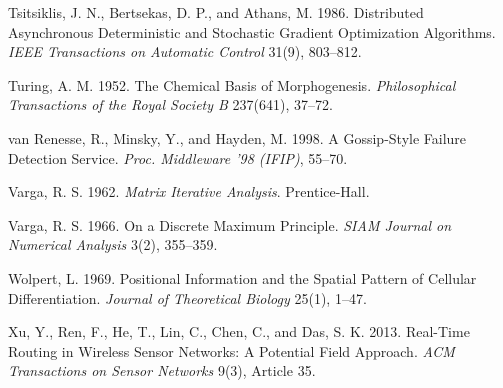 \documentclass[11pt]{article}
\theoremstyle{plain}
\numberwithin{equation}{section}
\begin{document}
Tsitsiklis, J. N., Bertsekas, D. P., and Athans, M. 1986. Distributed Asynchronous Deterministic and Stochastic Gradient Optimization Algorithms. \emph{IEEE Transactions on Automatic Control} 31(9), 803–812.

Turing, A. M. 1952. The Chemical Basis of Morphogenesis. \emph{Philosophical Transactions of the Royal Society B} 237(641), 37–72.

van Renesse, R., Minsky, Y., and Hayden, M. 1998. A Gossip-Style Failure Detection Service. \emph{Proc. Middleware '98 (IFIP)}, 55–70.

Varga, R. S. 1962. \emph{Matrix Iterative Analysis}. Prentice-Hall.

Varga, R. S. 1966. On a Discrete Maximum Principle. \emph{SIAM Journal on Numerical Analysis} 3(2), 355–359.

Wolpert, L. 1969. Positional Information and the Spatial Pattern of Cellular Differentiation. \emph{Journal of Theoretical Biology} 25(1), 1–47.

Xu, Y., Ren, F., He, T., Lin, C., Chen, C., and Das, S. K. 2013. Real-Time Routing in Wireless Sensor Networks: A Potential Field Approach. \emph{ACM Transactions on Sensor Networks} 9(3), Article 35.
\end{document}
